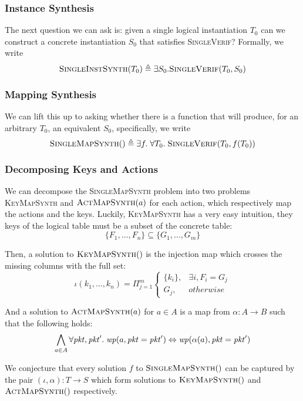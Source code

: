 \subsubsection{Instance Synthesis}

The next question we can ask is: given a single logical instantiation
$T_0$ can we construct a concrete instantiation $S_0$ that satisfies 
\textsc{SingleVerif}? Formally, we write
\[\textsc{SingleInstSynth}(T_0) \triangleq \exists
  S_0. \textsc{SingleVerif}(T_0, S_0)\]

\subsubsection{Mapping Synthesis}

We can lift this up to asking whether there is a function that will
produce, for an arbitrary $T_0$, an equivalent $S_0$, specifically, we write
\[\textsc{SingleMapSynth}() \triangleq \exists f. \; \forall T_0.\;
  \textsc{SingleVerif}(T_0, f(T_0))\]

\subsubsection{Decomposing Keys and Actions}

We can decompose the \textsc{SingleMapSynth} problem into two problems
\textsc{KeyMapSynth} and $\textsc{ActMapSynth}(a)$ for each action,
which respectively map the actions and the keys. Luckily,
\textsc{KeyMapSynth} has a very easy intuition, they keys of the
logical table must be a subset of the concrete table:
\[\{F_1, \ldots, F_n\} \subseteq \{G_1, \ldots, G_m\}\]

Then, a solution to $\textsc{KeyMapSynth}()$ is the injection map which crosses the missing columns with the full set:
\[\displaystyle \iota (k_1, \ldots, k_n) = \Pi_{j=1}^m \begin{cases}
    \{k_i\}, & \exists i,  F_i = G_j \\
    G_j, & \mathit{otherwise}
    \end{cases}
\]

And a solution to $\textsc{ActMapSynth}(a)$ for $a \in A$ is a map
from $\alpha : A \to B$ such that the following holds:
\[\bigwedge_{a \in A} \forall \mathit{pkt},\mathit{pkt}'.\; \mathit{wp}(a, \mathit{pkt} = \mathit{pkt}')
  \Leftrightarrow \mathit{wp}(\alpha(a), \mathit{pkt} = \mathit{pkt}')\] 

We conjecture that every solution $f$ to $\textsc{SingleMapSynth}()$
can be captured by the pair $(\iota, \alpha) : T \to S$ which form
solutions to $\textsc{KeyMapSynth}()$ and $\textsc{ActMapSynth}()$
respectively.

